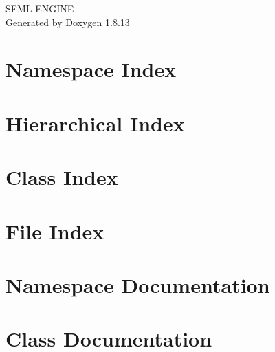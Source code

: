 \documentclass[twoside]{book}
\newcommand{\+}{\discretionary{\mbox{\scriptsize$\hookleftarrow$}}{}{}}
\newcommand{\clearemptydoublepage}{%
  \newpage{\pagestyle{empty}\cleardoublepage}%
}
\begin{document}
\hypersetup{pageanchor=false,
             bookmarksnumbered=true,
             pdfencoding=unicode
            }
\begin{titlepage}
\vspace*{7cm}
\begin{center}%
{\Large S\+F\+ML E\+N\+G\+I\+NE }\\
\vspace*{1cm}
{\large Generated by Doxygen 1.8.13}\\
\end{center}
\end{titlepage}
\clearemptydoublepage
{}
\tableofcontents
\clearemptydoublepage
{}
\hypersetup{pageanchor=true}

\chapter{Namespace Index}

\chapter{Hierarchical Index}

\chapter{Class Index}

\chapter{File Index}

\chapter{Namespace Documentation}

\chapter{Class Documentation}


























\end{document}
